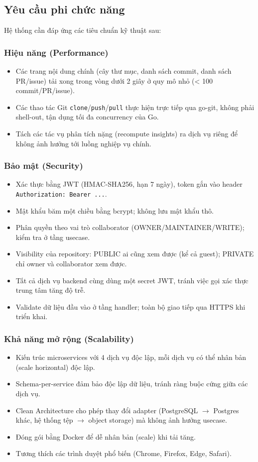 \subsection{Yêu cầu phi chức năng}
Hệ thống cần đáp ứng các tiêu chuẩn kỹ thuật sau:

\subsubsection{Hiệu năng (Performance)}
\begin{itemize}
\item Các trang nội dung chính (cây thư mục, danh sách commit, danh sách PR/issue) tải xong trong vòng dưới 2 giây ở quy mô nhỏ (< 100 commit/PR/issue).
\item Các thao tác Git \texttt{clone}/\texttt{push}/\texttt{pull} thực hiện trực tiếp qua go-git, không phải shell-out, tận dụng tối đa concurrency của Go.
\item Tách các tác vụ phân tích nặng (recompute insights) ra dịch vụ riêng để không ảnh hưởng tới luồng nghiệp vụ chính.
\end{itemize}

\subsubsection{Bảo mật (Security)}
\begin{itemize}
\item Xác thực bằng JWT (HMAC-SHA256, hạn 7 ngày), token gắn vào header \texttt{Authorization: Bearer ...}.
\item Mật khẩu băm một chiều bằng bcrypt; không lưu mật khẩu thô.
\item Phân quyền theo vai trò collaborator (OWNER/MAINTAINER/WRITE); kiểm tra ở tầng usecase.
\item Visibility của repository: PUBLIC ai cũng xem được (kể cả guest); PRIVATE chỉ owner và collaborator xem được.
\item Tất cả dịch vụ backend cùng dùng một secret JWT, tránh việc gọi xác thực trung tâm tăng độ trễ.
\item Validate dữ liệu đầu vào ở tầng handler; toàn bộ giao tiếp qua HTTPS khi triển khai.
\end{itemize}

\subsubsection{Khả năng mở rộng (Scalability)}
\begin{itemize}
\item Kiến trúc microservices với 4 dịch vụ độc lập, mỗi dịch vụ có thể nhân bản (scale horizontal) độc lập.
\item Schema-per-service đảm bảo độc lập dữ liệu, tránh ràng buộc cứng giữa các dịch vụ.
\item Clean Architecture cho phép thay đổi adapter (PostgreSQL $\to$ Postgres khác, hệ thống tệp $\to$ object storage) mà không ảnh hưởng usecase.
\item Đóng gói bằng Docker để dễ nhân bản (scale) khi tải tăng.
\item Tương thích các trình duyệt phổ biến (Chrome, Firefox, Edge, Safari).
\end{itemize}

